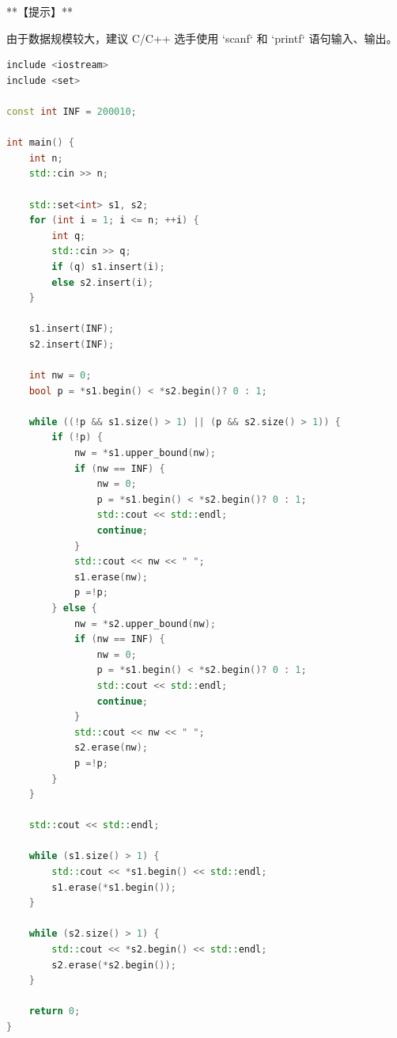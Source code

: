 \documentclass[12pt,twiside,a4paper]{ctexbook}
\numberwithin{chapter}{part}
\begin{document}
**【提示】**

由于数据规模较大，建议 C/C++ 选手使用 `scanf` 和 `printf` 语句输入、输出。
\begin{lstlisting}[language=c++,breaklines=true]
include <iostream>
include <set>

const int INF = 200010;

int main() {
    int n;
    std::cin >> n;

    std::set<int> s1, s2;
    for (int i = 1; i <= n; ++i) {
        int q;
        std::cin >> q;
        if (q) s1.insert(i);
        else s2.insert(i);
    }

    s1.insert(INF);
    s2.insert(INF);

    int nw = 0;
    bool p = *s1.begin() < *s2.begin()? 0 : 1;

    while ((!p && s1.size() > 1) || (p && s2.size() > 1)) {
        if (!p) {
            nw = *s1.upper_bound(nw);
            if (nw == INF) {
                nw = 0;
                p = *s1.begin() < *s2.begin()? 0 : 1;
                std::cout << std::endl;
                continue;
            }
            std::cout << nw << " ";
            s1.erase(nw);
            p =!p;
        } else {
            nw = *s2.upper_bound(nw);
            if (nw == INF) {
                nw = 0;
                p = *s1.begin() < *s2.begin()? 0 : 1;
                std::cout << std::endl;
                continue;
            }
            std::cout << nw << " ";
            s2.erase(nw);
            p =!p;
        }
    }

    std::cout << std::endl;

    while (s1.size() > 1) {
        std::cout << *s1.begin() << std::endl;
        s1.erase(*s1.begin());
    }

    while (s2.size() > 1) {
        std::cout << *s2.begin() << std::endl;
        s2.erase(*s2.begin());
    }

    return 0;
}
\end{lstlisting}

\begin{lstlisting}[language=c++,breaklines=true]

\end{lstlisting}

\section{}
\begin{lstlisting}[language=c++,breaklines=true]

\end{lstlisting}
\end{document}
